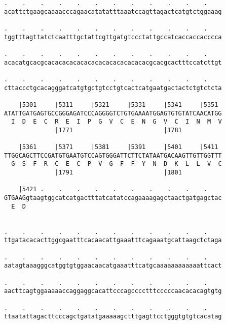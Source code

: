 \documentclass{article}
\begin{document}
\begin{Verbatim}
.    .    .    .    .    .    .    .    .    .    .    .    
acattctgaagcaaaacccagaacatatatttaaatccagttagactcatgtctggaaag
                                                            
.    .    .    .    .    .    .    .    .    .    .    .    
tggtttagttatctcaatttgctattcgttgatgtccctattgccatcaccaccacccca
                                                            
.    .    .    .    .    .    .    .    .    .    .    .    
acacatgcacgcacacacacacacacacacacacacacacgcacgcactttccatcttgt
                                                            
.    .    .    .    .    .    .    .    .    .    .    .    
cttaccctgcacagggatcatgtgctgtcctgtcactcatgaatgactactctgtctcta
                                                            
    |5301     |5311     |5321     |5331     |5341     |5351 
ATATTGATGAGTGCCGGGAGATCCCAGGGGTCTGTGAAAATGGAGTGTGTATCAACATGG
  I  D  E  C  R  E  I  P  G  V  C  E  N  G  V  C  I  N  M  V
              |1771                         |1781           
  
    |5361     |5371     |5381     |5391     |5401     |5411 
TTGGCAGCTTCCGATGTGAATGTCCAGTGGGATTCTTCTATAATGACAAGTTGTTGGTTT
  G  S  F  R  C  E  C  P  V  G  F  F  Y  N  D  K  L  L  V  C
              |1791                         |1801           
  
    |5421 .    .    .    .    .    .    .    .    .    .    
GTGAAGgtaagtggcatcatgactttatcatatccagaaaagagctaactgatgagctac
  E  D                                                      
                                                            
  
.    .    .    .    .    .    .    .    .    .    .    .    
ttgatacacacttggcgaatttcacaacattgaaatttcagaaatgcattaagctctaga
                                                            
.    .    .    .    .    .    .    .    .    .    .    .    
aatagtaaagggcatggtgtggaacaacatgaaatttcatgcaaaaaaaaaaaattcact
                                                            
.    .    .    .    .    .    .    .    .    .    .    .    
aacttcagtggaaaaaccaggaggcacattcccagcccctttcccccaacacacagtgtg
                                                            
.    .    .    .    .    .    .    .    .    .    .    .    
ttaatattagacttcccagctgatatgaaaaagctttgagttcctgggtgtgtcacatag
                                                            

\end{Verbatim}
\end{document}
